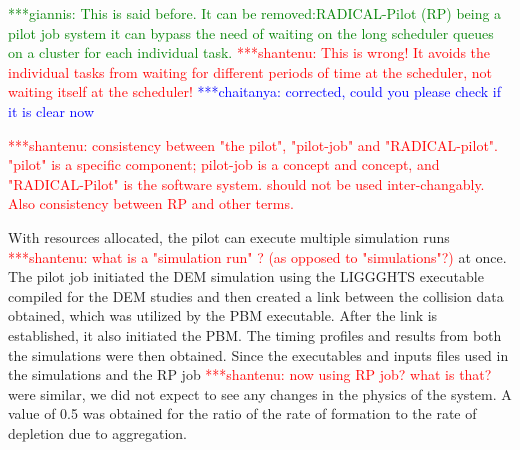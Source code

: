 \documentclass[preprint,11pt,authoryear]{elsarticle}
\newcommand{\jhanote}[1]{ {\textcolor{red} { ***shantenu: #1 }}}
\newcommand{\csnote}[1]{ {\textcolor{blue} { ***chaitanya: #1 }}}
\newcommand{\gpnote}[1]{{\textcolor{green} {***giannis: #1}}}
\newcommand{\jhanote}[1]{ {\textcolor{red} { ***shantenu: #1 }}}
\newcommand{\csnote}[1]{}
\newcommand{\gpnote}[1]{}
\begin{document}
\gpnote{This is said before. It can be removed:RADICAL-Pilot (RP) being a pilot job system it can bypass the need of
waiting on the long scheduler queues on a cluster for each individual task.} \jhanote{This is wrong! It
avoids the individual tasks from waiting for different periods of time at the
scheduler, not waiting itself at the scheduler!} \csnote{corrected, could you please check if it is clear now} 

\jhanote{consistency between
"the pilot", "pilot-job" and "RADICAL-pilot". "pilot" is a specific component; pilot-job is a  concept and concept, and "RADICAL-Pilot" is the software system. should not be used inter-changably. Also consistency between RP and other terms.} 

With resources allocated, the pilot can execute multiple simulation runs
\jhanote{what is a "simulation run" ? (as opposed to "simulations"?)} at once.
The pilot job initiated the DEM simulation using the LIGGGHTS executable
compiled for the DEM studies and then created a link between the collision
data obtained, which was utilized by the PBM executable. After the link is
established, it also initiated the PBM. The timing profiles and results from
both the simulations were then obtained. Since the executables and inputs
files used in the simulations and the RP job \jhanote{now using RP job? what
is that?} were similar, we did not expect to see any changes in the physics of
the system. A value of 0.5 was obtained for the ratio of the rate of formation
to the rate of depletion due to aggregation.
\end{document}
